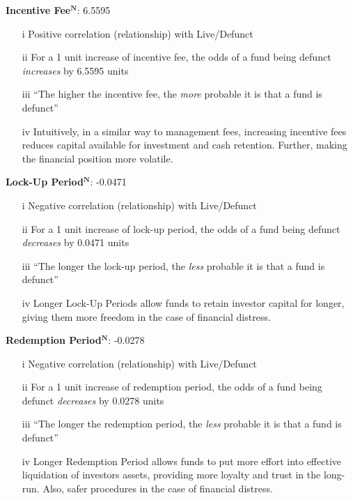 \documentclass[11pt, english]{article}
\begin{document}
	\textbf{Incentive Fee$\mathbf{^N}$}: 6.5595

	\begin{itemize}
        \setlength\itemsep{0cm}
		\item[i] Positive correlation (relationship) with Live/Defunct
		\item[ii] For a 1 unit increase of incentive fee, the odds of a fund being defunct \textit{increases} by 6.5595 units
		\item[iii] ``The higher the incentive fee, the \textit{more} probable it is that a fund is defunct''
		\item[iv] Intuitively, in a similar way to management fees, increasing incentive fees reduces capital available for investment and cash retention. Further, making the financial position more volatile.
	\end{itemize}

	\textbf{Lock-Up Period$\mathbf{^N}$}: -0.0471

        \begin{itemize}
        \setlength\itemsep{0cm}
                \item[i] Negative correlation (relationship) with Live/Defunct
		\item[ii] For a 1 unit increase of lock-up period, the odds of a fund being defunct \textit{decreases} by 0.0471 units
		\item[iii] ``The longer the lock-up period, the \textit{less} probable it is that a fund is defunct''
                \item[iv] Longer Lock-Up Periods allow funds to retain investor capital for longer, giving them more freedom in the case of financial distress.
        \end{itemize}

	\textbf{Redemption Period$\mathbf{^N}$}: -0.0278

        \begin{itemize}
        \setlength\itemsep{0cm}
                \item[i] Negative correlation (relationship) with Live/Defunct
		\item[ii] For a 1 unit increase of redemption period, the odds of a fund being defunct \textit{decreases} by 0.0278 units
		\item[iii] ``The longer the redemption period, the \textit{less} probable it is that a fund is defunct''
                \item[iv] Longer Redemption Period allows funds to put more effort into effective liquidation of investors assets, providing more loyalty and trust in the long-run. Also, safer procedures in the case of financial distress.
        \end{itemize}
\end{document}
